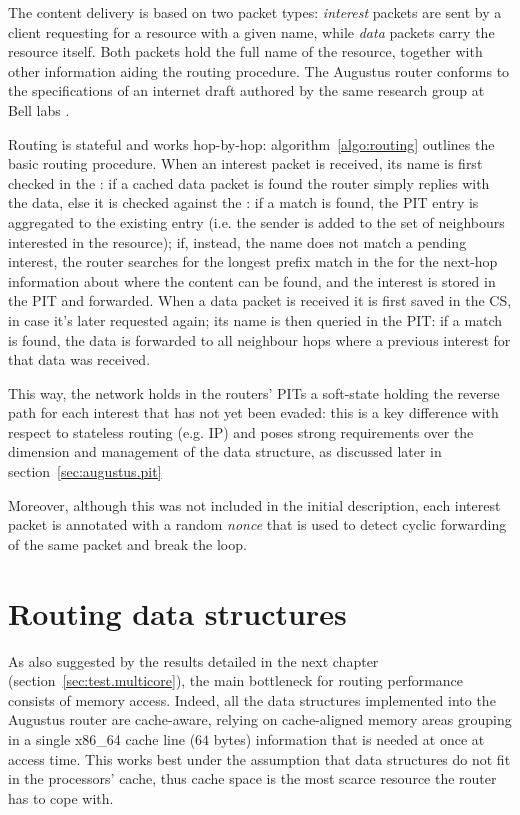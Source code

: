 \documentclass[11pt,a4paper,twoside,titlepage,openany]{book}
\begin{document}
The content delivery is based on two packet types: \emph{interest} packets are sent by a client requesting for a resource with a given name, while \emph{data} packets carry the resource itself. Both packets hold the full name of the resource, together with other information aiding the routing procedure.
The Augustus router conforms to the specifications of an internet draft authored by the same research group at Bell labs \cite{icn-packet}.

Routing is stateful and works hop-by-hop: algorithm~\ref{algo:routing} outlines the basic routing procedure. When an interest packet is received, its name is first checked in the : if a cached data packet is found the router simply replies with the data, else it is checked against the : if a match is found, the PIT entry is aggregated to the existing entry (i.e. the sender is added to the set of neighbours interested in the resource); if, instead, the name does not match a pending interest, the router searches for the longest prefix match in the  for the next-hop information about where the content can be found, and the interest is stored in the PIT and forwarded.
When a data packet is received it is first saved in the CS, in case it's later requested again; its name is then queried in the PIT: if a match is found, the data is forwarded to all neighbour hops where a previous interest for that data was received.

This way, the network holds in the routers' \gls{PIT}s a soft-state holding the reverse path for each interest that has not yet been evaded: this is a key difference with respect to stateless routing (e.g. IP) and poses strong requirements over the dimension and management of the data structure, as discussed later in section~\ref{sec:augustus.pit}

Moreover, although this was not included in the initial description, each interest packet is annotated with a random \emph{nonce} that is used to detect cyclic forwarding of the same packet and break the loop.


\section{Routing data structures}\label{sec:augustus.structures}
As also suggested by the results detailed in the next chapter (section~\ref{sec:test.multicore}), the main bottleneck for routing performance consists of memory access. Indeed, all the data structures implemented into the Augustus router are cache-aware, relying on cache-aligned memory areas grouping in a single x86\_64 cache line ($64$ bytes) information that is needed at once at access time.
This works best under the assumption that data structures do not fit in the processors' cache, thus cache space is the most scarce resource the router has to cope with.
\end{document}
